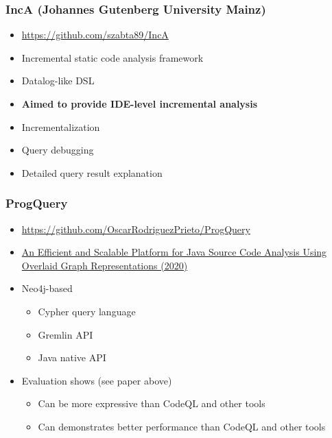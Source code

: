 \documentclass[xcolor=table,aspectratio=169]{beamer}
\begin{document}
\begin{frame}[fragile]
  \frametitle{IncA (Johannes Gutenberg University Mainz)} 
  \begin{minipage}[t]{0.53\textwidth}
  \begin{itemize}
    \item \url{https://github.com/szabta89/IncA}
    \item Incremental static code analysis framework
    \item Datalog-like DSL
    \item \textbf{Aimed to provide IDE-level incremental analysis}
  \end{itemize}
\end{minipage}
\pause
\begin{minipage}[t]{0.46\textwidth}
  \begin{itemize}
    \item[\faPlus] Incrementalization
    \item[\faQuestion] Query debugging
    \item[\faQuestion] Detailed query result explanation  
  \end{itemize}
\end{minipage}
\end{frame}

\begin{frame}[fragile]
  \frametitle{ProgQuery}
  \begin{itemize}
    \item \url{https://github.com/OscarRodriguezPrieto/ProgQuery}
    \item \href{https://ieeexplore.ieee.org/stamp/stamp.jsp?tp=&arnumber=9064792}{An Efficient and Scalable Platform for Java Source Code Analysis Using Overlaid Graph Representations (2020)}
    \item Neo4j-based
    \begin{itemize}
      \item Cypher query language
      \item Gremlin API
      \item Java native API
    \end{itemize}
    \item Evaluation shows (see paper above)
    \begin{itemize}
      \item Can be more expressive than CodeQL and other tools
      \item Can demonstrates better performance than CodeQL and other tools
    \end{itemize} 
  \end{itemize}
\end{frame}
\end{document}

